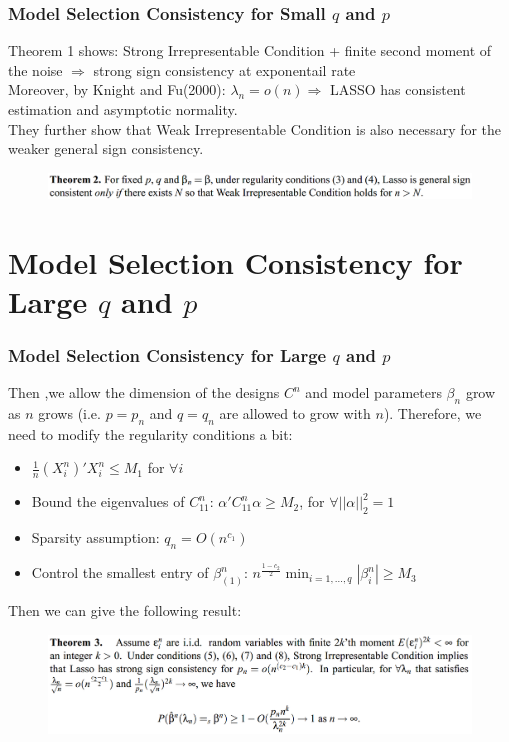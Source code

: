 \documentclass{beamer}
\begin{document}
	\begin{frame}
		\frametitle{Model Selection Consistency for Small $q$ and $p$}
		
		Theorem 1 shows: Strong Irrepresentable Condition + finite second moment of the noise $\Rightarrow$ strong sign consistency at exponentail rate\\
		\vspace{\baselineskip}
		Moreover, by Knight and Fu(2000): $\lambda_n = o(n) \Rightarrow$ LASSO has consistent estimation and asymptotic normality.\\
		\vspace{\baselineskip}
		They further show that Weak Irrepresentable Condition is also necessary for the weaker general sign consistency.
		\begin{figure}
			\includegraphics[width=1\linewidth]{image007.png}
		\end{figure}
	\end{frame}
	
	\section{Model Selection Consistency for Large $q$ and $p$}
	
	\begin{frame}
		\frametitle{Model Selection Consistency for Large $q$ and $p$}
		Then ,we allow the dimension of the designs $C^n$ and model parameters $\beta_n$ grow as $n$ grows (i.e. $p=p_n$ and $q = q_n$ are allowed to grow with $n$). Therefore, we need to modify the regularity conditions a bit:
		\begin{itemize}
			\item 
			$\frac{1}{n}(X_i^n)'X_i^n \leq M_1$ for $\forall i$
			\item
			Bound the eigenvalues of $C_{11}^n$: $\alpha'C_{11}^n \alpha \geq M_2$, for $\forall ||\alpha||_2^2 = 1$
			\item
			Sparsity assumption: $q_n = O(n^{c_1})$
			\item
			Control the smallest entry of $\beta_{(1)}^n$: $n^{\frac{1-c_2}{2}}\min_{i=1,\ldots,q}|\beta_i^n| \geq M_3$
		\end{itemize} 
		Then we can give the following result:
		\begin{figure}
			\includegraphics[width=1\linewidth]{image008.png}
		\end{figure}
	\end{frame}
		
\end{document}
